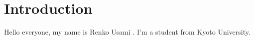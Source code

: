 \documentclass[12pt, a4paper]{article}
\begin{document}
\section{Introduction}
Hello everyone, my name is Renko Usami 
\cite{usami20xx}.
I'm a student from Kyoto University.

{}

\end{document}
